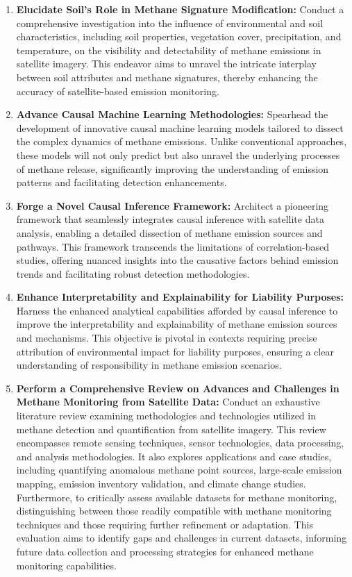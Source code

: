 \begin{enumerate}
    \item \textbf{Elucidate Soil's Role in Methane Signature Modification:} Conduct a comprehensive investigation into the influence of environmental and soil characteristics, including soil properties, vegetation cover, precipitation, and temperature, on the visibility and detectability of methane emissions in satellite imagery. This endeavor aims to unravel the intricate interplay between soil attributes and methane signatures, thereby enhancing the accuracy of satellite-based emission monitoring.
    
    \item \textbf{Advance Causal Machine Learning Methodologies:} Spearhead the development of innovative causal machine learning models tailored to dissect the complex dynamics of methane emissions. Unlike conventional approaches, these models will not only predict but also unravel the underlying processes of methane release, significantly improving the understanding of emission patterns and facilitating detection enhancements.
    
    \item \textbf{Forge a Novel Causal Inference Framework:} Architect a pioneering framework that seamlessly integrates causal inference with satellite data analysis, enabling a detailed dissection of methane emission sources and pathways. This framework transcends the limitations of correlation-based studies, offering nuanced insights into the causative factors behind emission trends and facilitating robust detection methodologies.
    
    \item \textbf{Enhance Interpretability and Explainability for Liability Purposes:} Harness the enhanced analytical capabilities afforded by causal inference to improve the interpretability and explainability of methane emission sources and mechanisms. This objective is pivotal in contexts requiring precise attribution of environmental impact for liability purposes, ensuring a clear understanding of responsibility in methane emission scenarios.

    \item \textbf{Perform a Comprehensive Review on Advances and Challenges in Methane Monitoring from Satellite Data:} Conduct an exhaustive literature review examining methodologies and technologies utilized in methane detection and quantification from satellite imagery. This review encompasses remote sensing techniques, sensor technologies, data processing, and analysis methodologies. It also explores applications and case studies, including quantifying anomalous methane point sources, large-scale emission mapping, emission inventory validation, and climate change studies. Furthermore, to critically assess available datasets for methane monitoring, distinguishing between those readily compatible with methane monitoring techniques and those requiring further refinement or adaptation. This evaluation aims to identify gaps and challenges in current datasets, informing future data collection and processing strategies for enhanced methane monitoring capabilities.


\end{enumerate}
